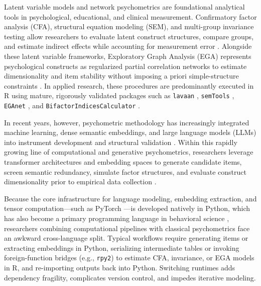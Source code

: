 ﻿\documentclass[12pt,letterpaper]{article}
\begin{document}
Latent variable models and network psychometrics are foundational analytical tools in psychological, educational, and clinical measurement. Confirmatory factor analysis (CFA), structural equation modeling (SEM), and multi-group invariance testing allow researchers to evaluate latent construct structures, compare groups, and estimate indirect effects while accounting for measurement error \parencite{bollen1989, byrne1989, muthen1984}. Alongside these latent variable frameworks, Exploratory Graph Analysis (EGA) represents psychological constructs as regularized partial correlation networks to estimate dimensionality and item stability without imposing a priori simple-structure constraints \parencite{christensen2021, epskamp2018, golino2017}. In applied research, these procedures are predominantly executed in R using mature, rigorously validated packages such as \texttt{lavaan} \parencite{rosseel2012}, \texttt{semTools} \parencite{jorgensen2026}, \texttt{EGAnet} \parencite{golino2017}, and \texttt{BifactorIndicesCalculator} \parencite{dueber2021}.

In recent years, however, psychometric methodology has increasingly integrated machine learning, dense semantic embeddings, and large language models (LLMs) into instrument development and structural validation \parencite{vondavier2021}. Within this rapidly growing line of computational and generative psychometrics, researchers leverage transformer architectures and embedding spaces to generate candidate items, screen semantic redundancy, simulate factor structures, and evaluate construct dimensionality prior to empirical data collection \parencite{hommel2022, kjell2019, russelllasalandra2026, urban2021, wulff2025}.

Because the core infrastructure for language modeling, embedding extraction, and tensor computation---such as PyTorch \parencite{paszke2019}---is developed natively in Python, which has also become a primary programming language in behavioral science \parencite{peirce2019}, researchers combining computational pipelines with classical psychometrics face an awkward cross-language split. Typical workflows require generating items or extracting embeddings in Python, serializing intermediate tables or invoking foreign-function bridges (e.g., \texttt{rpy2}) to estimate CFA, invariance, or EGA models in R, and re-importing outputs back into Python. Switching runtimes adds dependency fragility, complicates version control, and impedes iterative modeling.
\end{document}

